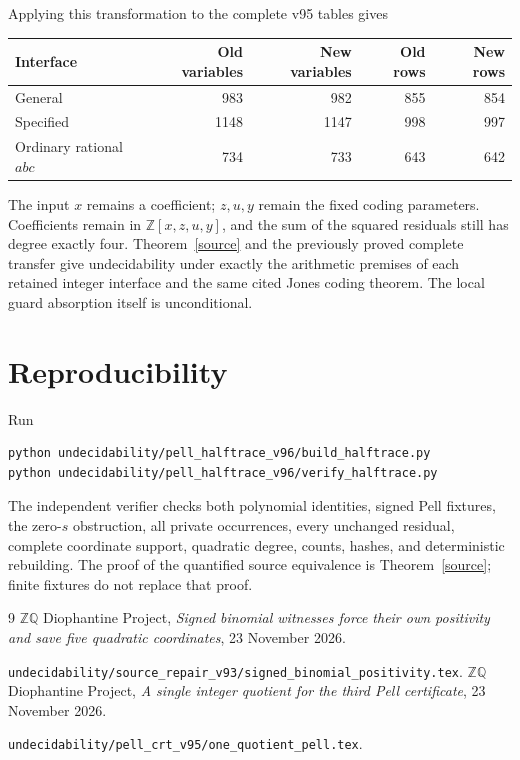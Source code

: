 \documentclass[11pt]{article}
\newcommand{\Z}{\mathbb Z}\newcommand{\Q}{\mathbb Q}
\begin{document}
Applying this transformation to the complete v95 tables gives
\begin{center}
\begin{tabular}{lrrrr}
\toprule
Interface&Old variables&New variables&Old rows&New rows\\
\midrule
General&983&982&855&854\\
Specified&1148&1147&998&997\\
Ordinary rational \(abc\)&734&733&643&642\\
\bottomrule
\end{tabular}
\end{center}
The input \(x\) remains a coefficient; \(z,u,y\) remain the fixed
coding parameters. Coefficients remain in \(\Z[x,z,u,y]\), and
the sum of the squared residuals still has degree exactly four.
Theorem~\ref{source} and the previously proved complete transfer
give undecidability under exactly the arithmetic premises of each
retained integer interface and the same cited Jones coding theorem.
The local guard absorption itself is unconditional.

\section{Reproducibility}

Run
\begin{verbatim}
python undecidability/pell_halftrace_v96/build_halftrace.py
python undecidability/pell_halftrace_v96/verify_halftrace.py
\end{verbatim}
The independent verifier checks both polynomial identities, signed
Pell fixtures, the zero-\(s\) obstruction, all private occurrences,
every unchanged residual, complete coordinate support, quadratic
degree, counts, hashes, and deterministic rebuilding. The proof of
the quantified source equivalence is Theorem~\ref{source}; finite
fixtures do not replace that proof.

\begin{thebibliography}{9}
\small\setlength{\itemsep}{2pt}
 \(\mathbb Z\mathbb Q\) Diophantine Project,
\emph{Signed binomial witnesses force their own positivity and save
five quadratic coordinates}, 23 November 2026.\par
\nolinkurl{undecidability/source_repair_v93/signed_binomial_positivity.tex}.
 \(\mathbb Z\mathbb Q\) Diophantine Project,
\emph{A single integer quotient for the third Pell certificate},
23 November 2026.\par
\nolinkurl{undecidability/pell_crt_v95/one_quotient_pell.tex}.
\end{thebibliography}
\end{document}
